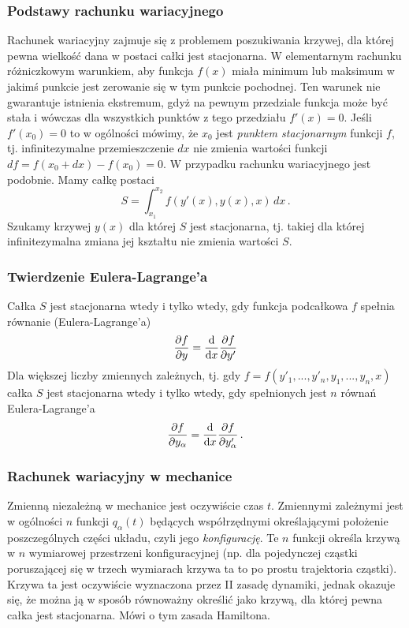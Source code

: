 \documentclass[../main.tex]{subfiles}
\begin{document}
\subsubsection{Podstawy rachunku wariacyjnego}
Rachunek wariacyjny zajmuje się z problemem poszukiwania krzywej, dla której pewna wielkość dana w postaci całki jest stacjonarna. W elementarnym rachunku różniczkowym warunkiem, aby funkcja \(f(x)\) miała minimum lub maksimum w jakimś punkcie jest zerowanie się w tym punkcie pochodnej. Ten warunek nie gwarantuje istnienia ekstremum, gdyż na pewnym przedziale funkcja może być stała i wówczas dla wszystkich punktów z tego przedziału \(f'(x)=0\). Jeśli \(f'(x_0)=0\) to w ogólności mówimy, że \(x_0\) jest \textit{punktem stacjonarnym} funkcji \(f\), tj. infinitezymalne przemieszczenie \(dx\) nie zmienia wartości funkcji \(df=f(x_0+dx)-f(x_0)=0\). W przypadku rachunku wariacyjnego jest podobnie. Mamy całkę postaci
\begin{equation*}
    S=\int_{x_1}^{x_2}f(y'(x),y(x),x)\,dx\,.
\end{equation*}
Szukamy krzywej \(y(x)\) dla której \(S\) jest stacjonarna, tj. takiej dla której infinitezymalna zmiana jej kształtu nie zmienia wartości \(S\).
\subsubsection*{Twierdzenie Eulera-Lagrange'a}
Całka \(S\) jest stacjonarna wtedy i tylko wtedy, gdy funkcja podcałkowa \(f\) spełnia równanie (Eulera-Lagrange'a)
\begin{equation*}
    \frac{\partial f}{\partial y}=\dv{}{x}\frac{\partial f}{\partial y'}
\end{equation*}
Dla większej liczby zmiennych zależnych, tj. gdy \(f=f(y'_1,...,y'_n,y_1,...,y_n,x)\) całka \(S\) jest stacjonarna wtedy i tylko wtedy, gdy spełnionych jest \(n\) równań Eulera-Lagrange'a
\begin{equation*}
    \frac{\partial f}{\partial y_{\alpha}}=\dv{}{x}\frac{\partial f}{\partial y'_\alpha}\,.
\end{equation*}
\subsubsection{Rachunek wariacyjny w mechanice}
Zmienną niezależną w mechanice jest oczywiście czas \(t\). Zmiennymi zależnymi jest w ogólności \(n\) funkcji \(q_\alpha(t)\) będących współrzędnymi określającymi położenie poszczególnych części układu, czyli jego \textit{konfigurację}. Te \(n\) funkcji określa krzywą w \(n\) wymiarowej przestrzeni konfiguracyjnej (np. dla pojedynczej cząstki poruszającej się w trzech wymiarach krzywa ta to po prostu trajektoria cząstki). Krzywa ta jest oczywiście wyznaczona przez II zasadę dynamiki, jednak okazuje się, że można ją w sposób równoważny określić jako krzywą, dla której pewna całka jest stacjonarna. Mówi o tym zasada Hamiltona.
\medskip
\end{document}
